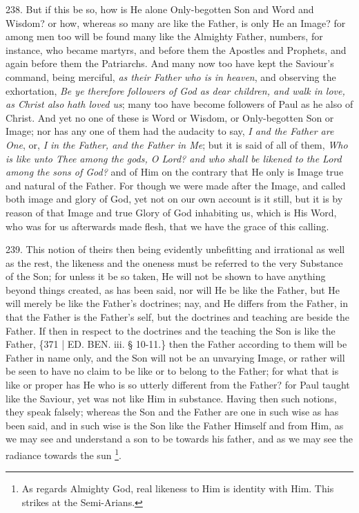 238. But if
this be so, how is He alone Only-begotten Son and Word and Wisdom? or
how, whereas so many are like the Father, is only He an Image? for
among men too will be found many like the Almighty Father, numbers,
for instance, who became martyrs, and before them the Apostles and
Prophets, and again before them the Patriarchs. And many now too have
kept the Saviour's command, being merciful, \emph{as their Father who is
in heaven}, and observing the exhortation, \emph{Be ye therefore
followers of God as dear children, and walk in love, as Christ also
hath loved us}; many too have become followers of Paul as he also
of Christ. And yet no one of these is Word or Wisdom, or Only-begotten
Son or Image; nor has any one of them had the audacity to say, \emph{I
and the Father are One}, or, \emph{I in the Father, and the Father in
Me}; but it is said of all of them, \emph{Who is like unto Thee among
the gods, O Lord? and who shall be likened to the Lord among the sons
of God?} and of Him on the contrary that He only is Image true and
natural of the Father. For though we were made after the Image, and
called both image and glory of God, yet not on our own account is it
still, but it is by reason of that Image and true Glory of God
inhabiting us, which is His Word, who was for us afterwards made
flesh, that we have the grace of this calling.

239. This
notion of theirs then being evidently unbefitting and irrational as
well as the rest, the likeness and the oneness must be referred to the
very Substance of the Son; for unless it be so taken, He will not be
shown to have anything beyond things created, as has been said, nor
will He be like the Father, but He will merely be like the Father's
doctrines; nay, and He differs from the Father, in that the Father is
the Father's self, but the doctrines and teaching are beside the
Father. If then in respect to the doctrines and the teaching the Son
is like the Father, \{371 | ED. BEN.
iii. § 10-11.\} then the Father according to them will be Father in
name only, and the Son will not be an unvarying Image, or rather will
be seen to have no claim to be like or to belong to the Father; for
what that is like or proper has He who is so utterly different from
the Father? for Paul taught like the Saviour, yet was not like Him in
substance. Having then such notions, they speak falsely; whereas the
Son and the Father are one in such wise as has been said, and in such
wise is the Son like the Father Himself and from Him, as we may see
and understand a son to be towards his father, and as we may see the
radiance towards the sun \footnote{As regards Almighty God, real likeness to Him is identity with Him.
This strikes at the Semi-Arians.}.


